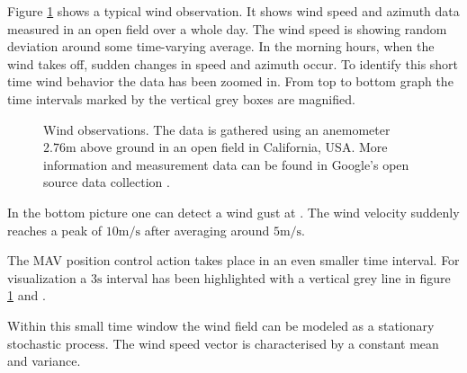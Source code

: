 Figure \ref{fig:wind_observations} shows a typical wind observation. It shows wind speed and azimuth data measured in an open field over a whole day. The wind speed is showing random deviation around some time-varying average. In the morning hours, when the wind takes off, sudden changes in speed and azimuth occur. To identify this short time wind behavior the data has been zoomed in. From top to bottom graph the time intervals marked by the vertical grey boxes are magnified.

\begin{figure}
\centering
{}
\qquad
{}
\qquad
{}
\caption[Wind observations]{Wind observations. The data is gathered using an anemometer $2.76 \si{\metre}$ above ground in an open field in California, USA. More information and measurement data can be found in Google's open source data collection \cite{www:googleosb,www:googleheliostat}.}
\label{fig:wind_observations}
\end{figure}

In the bottom picture  one can detect a wind gust at . The wind velocity suddenly reaches a peak of $10 \si{\metre\per\second}$ after averaging around $5 \si{\metre\per\second}$. 

The MAV position control action takes place in an even smaller time interval. For visualization a $3 \si{\second}$ interval has been highlighted with a vertical grey line in figure \ref{fig:wind_observations}  and . 

Within this small time window the wind field can be modeled as a stationary stochastic process. The wind speed vector is characterised by a constant mean and variance.

